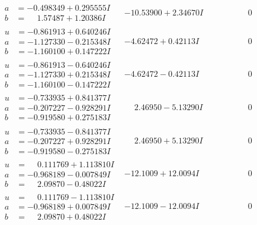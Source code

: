 \documentclass[1p]{elsarticle_modified}
\theoremstyle{definition}
\begin{document}
$$\begin{array}{c|c|c}
\begin{aligned}
a &= -0.498349 + 0.295555 I \\
b &= \phantom{-}1.57487 + 1.20386 I\end{aligned}
 & -10.53900 + 2.34670 I & \phantom{-0.000000 } 0 \\ \hline\begin{aligned}
u &= -0.861913 + 0.640246 I \\
a &= -1.127330 - 0.215348 I \\
b &= -1.160100 + 0.147222 I\end{aligned}
 & -4.62472 + 0.42113 I & \phantom{-0.000000 } 0 \\ \hline\begin{aligned}
u &= -0.861913 - 0.640246 I \\
a &= -1.127330 + 0.215348 I \\
b &= -1.160100 - 0.147222 I\end{aligned}
 & -4.62472 - 0.42113 I & \phantom{-0.000000 } 0 \\ \hline\begin{aligned}
u &= -0.733935 + 0.841377 I \\
a &= -0.207227 - 0.928291 I \\
b &= -0.919580 + 0.275183 I\end{aligned}
 & \phantom{-}2.46950 - 5.13290 I & \phantom{-0.000000 } 0 \\ \hline\begin{aligned}
u &= -0.733935 - 0.841377 I \\
a &= -0.207227 + 0.928291 I \\
b &= -0.919580 - 0.275183 I\end{aligned}
 & \phantom{-}2.46950 + 5.13290 I & \phantom{-0.000000 } 0 \\ \hline\begin{aligned}
u &= \phantom{-}0.111769 + 1.113810 I \\
a &= -0.968189 - 0.007849 I \\
b &= \phantom{-}2.09870 - 0.48022 I\end{aligned}
 & -12.1009 + 12.0094 I & \phantom{-0.000000 } 0 \\ \hline\begin{aligned}
u &= \phantom{-}0.111769 - 1.113810 I \\
a &= -0.968189 + 0.007849 I \\
b &= \phantom{-}2.09870 + 0.48022 I\end{aligned}
 & -12.1009 - 12.0094 I & \phantom{-0.000000 } 0 \\ \hline\begin{aligned}

\end{aligned}
\end{array}$$
\end{document}
